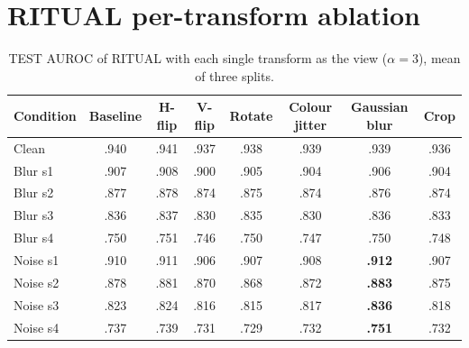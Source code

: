 \documentclass[10pt,a4paper]{article}
\begin{document}
\section{RITUAL per-transform ablation}\label{app:ritual}
\begin{table}[H]
\centering\small
\caption{TEST AUROC of RITUAL with each single transform as the view ($\alpha{=}3$), mean of three splits.}
\begin{tabular}{@{}lccccccc@{}}
\toprule
Condition & Baseline & H-flip & V-flip & Rotate & Colour jitter & Gaussian blur & Crop\\
\midrule
Clean    & .940 & .941 & .937 & .938 & .939 & .939 & .936\\
\addlinespace
Blur s1  & .907 & .908 & .900 & .905 & .904 & .906 & .904\\
Blur s2  & .877 & .878 & .874 & .875 & .874 & .876 & .874\\
Blur s3  & .836 & .837 & .830 & .835 & .830 & .836 & .833\\
Blur s4  & .750 & .751 & .746 & .750 & .747 & .750 & .748\\
\addlinespace
Noise s1 & .910 & .911 & .906 & .907 & .908 & \textbf{.912} & .907\\
Noise s2 & .878 & .881 & .870 & .868 & .872 & \textbf{.883} & .875\\
Noise s3 & .823 & .824 & .816 & .815 & .817 & \textbf{.836} & .818\\
Noise s4 & .737 & .739 & .731 & .729 & .732 & \textbf{.751} & .732\\
\bottomrule
\end{tabular}
\end{table}
\end{document}
